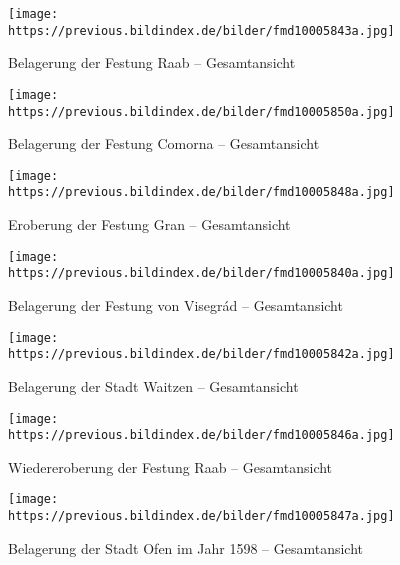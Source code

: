 \documentclass[
  a4paper,
]{book}
\begin{document}
\begin{figure*}
\clearpage

\begin{figure}[H]    
  \texttt{[image: https://previous.bildindex.de/bilder/fmd10005843a.jpg]}
  \caption{Belagerung der Festung Raab – Gesamtansicht}
  \label{fig:{https://previous.bildindex.de/bilder/fmd10005843a.jpg}}
\end{figure}

\clearpage

\begin{figure}[H]    
  \texttt{[image: https://previous.bildindex.de/bilder/fmd10005850a.jpg]}
  \caption{Belagerung der Festung Comorna – Gesamtansicht}
  \label{fig:{https://previous.bildindex.de/bilder/fmd10005850a.jpg}}
\end{figure}

\clearpage

\begin{figure}[H]    
  \texttt{[image: https://previous.bildindex.de/bilder/fmd10005848a.jpg]}
  \caption{Eroberung der Festung Gran – Gesamtansicht}
  \label{fig:{https://previous.bildindex.de/bilder/fmd10005848a.jpg}}
\end{figure}

\clearpage

\begin{figure}[H]    
  \texttt{[image: https://previous.bildindex.de/bilder/fmd10005840a.jpg]}
  \caption{Belagerung der Festung von Visegrád – Gesamtansicht}
  \label{fig:{https://previous.bildindex.de/bilder/fmd10005840a.jpg}}
\end{figure}

\clearpage

\begin{figure}[H]    
  \texttt{[image: https://previous.bildindex.de/bilder/fmd10005842a.jpg]}
  \caption{Belagerung der Stadt Waitzen – Gesamtansicht}
  \label{fig:{https://previous.bildindex.de/bilder/fmd10005842a.jpg}}
\end{figure}

\clearpage

\begin{figure}[H]    
  \texttt{[image: https://previous.bildindex.de/bilder/fmd10005846a.jpg]}
  \caption{Wiedereroberung der Festung Raab – Gesamtansicht}
  \label{fig:{https://previous.bildindex.de/bilder/fmd10005846a.jpg}}
\end{figure}

\clearpage

\begin{figure}[H]    
  \texttt{[image: https://previous.bildindex.de/bilder/fmd10005847a.jpg]}
  \caption{Belagerung der Stadt Ofen im Jahr 1598 – Gesamtansicht}
  \label{fig:{https://previous.bildindex.de/bilder/fmd10005847a.jpg}}
\end{figure}


\end{figure*}
\end{document}

